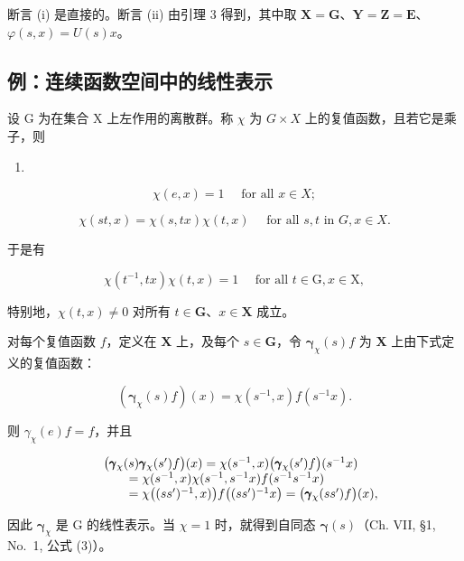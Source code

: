断言 (i) 是直接的。断言 (ii) 由引理 3 得到，其中取 \(\mathbf{X} = \mathbf{G}\)、\(\mathbf{Y} = \mathbf{Z} = \mathbf{E}\)、\(\varphi(s, x) = U(s)x\)。

\subsection{例：连续函数空间中的线性表示}

设 G 为在集合 X 上左作用的离散群。称 \(\chi\) 为 \(G \times X\) 上的复值函数，且若它是乘子，则

\begin{enumerate}
\def\labelenumi{(\arabic{enumi})}
\tightlist
\item
\end{enumerate}

\[
\chi (e, x) = 1 \quad \text { for   all } x \in X;\tag{2}
\]

\[
\chi (s t, x) = \chi (s, t x) \chi (t, x) \quad \text { for   all } s, t \text { in } G, x \in X.
\]

于是有

\[
\chi (t ^ {- 1}, t x) \chi (t, x) = 1 \quad \text { for   all } t \in \mathrm{G}, x \in \mathrm{X},\tag{3}
\]

特别地，\(\chi(t, x) \neq 0\) 对所有 \(t \in \mathbf{G}\)、\(x \in \mathbf{X}\) 成立。

对每个复值函数 \(f\)，定义在 \(\mathbf{X}\) 上，及每个 \(s \in \mathbf{G}\)，令 \(\pmb{\gamma}_{\chi}(s)f\) 为 \(\mathbf{X}\) 上由下式定义的复值函数：

\[
\left(\boldsymbol {\gamma} _ {\chi} (s) f\right) (x) = \chi (s ^ {- 1}, x) f (s ^ {- 1} x).\tag{4}
\]

则 \(\gamma_{\chi}(e)f = f\)，并且

\[
\begin{array}{r l} & {\big (\pmb {\gamma} _ {\chi} (s) \pmb {\gamma} _ {\chi} (s ^ {\prime}) f \big) (x) = \chi (s ^ {- 1}, x) \big (\pmb {\gamma} _ {\chi} (s ^ {\prime}) f \big) (s ^ {- 1} x)} \\ & {\qquad = \chi (s ^ {- 1}, x) \chi (s ^ {- 1}, s ^ {- 1} x) f (s ^ {- 1} s ^ {- 1} x)} \\ & {\qquad = \chi \big ((s s ^ {\prime}) ^ {- 1}, x) \big) f \big ((s s ^ {\prime}) ^ {- 1} x \big) = \big (\pmb {\gamma} _ {\chi} (s s ^ {\prime}) f \big) (x),} \end{array}
\]

因此 \(\pmb{\gamma}_{\chi}\) 是 G 的线性表示。当 \(\chi = 1\) 时，就得到自同态 \(\pmb{\gamma}(s)\)（Ch. VII, §1, No.~1, 公式 (3)）。

